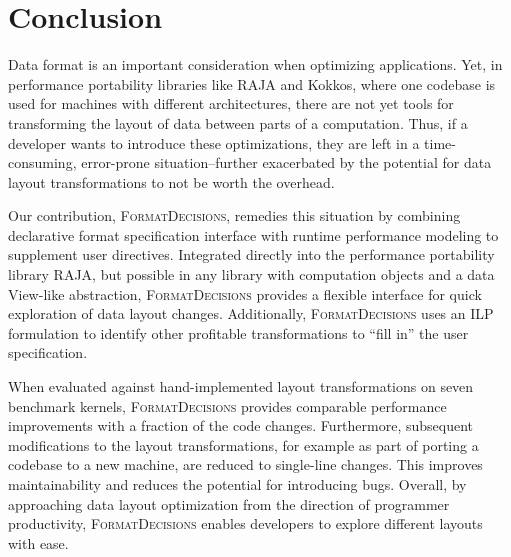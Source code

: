 \documentclass[sigconf,review=true]{acmart}
\newcommand{\FormatDecisions}[0]{{\textsc{FormatDecisions}}}
\begin{document}
\section{Conclusion}

Data format is an important consideration when optimizing applications.
Yet, in performance portability libraries like RAJA and Kokkos, where one codebase is used for machines with different architectures, there are not yet tools for transforming the layout of data between parts of a computation. 
Thus, if a developer wants to introduce these optimizations, they are left in a time-consuming, error-prone situation--further exacerbated by the potential for data layout transformations to not be worth the overhead.

Our contribution, \FormatDecisions, remedies this situation by combining declarative format specification  interface with runtime performance modeling to supplement user directives.
Integrated directly into the performance portability library RAJA, but possible in any library with computation objects and a data View-like abstraction, \FormatDecisions{} provides a flexible interface for quick exploration of data layout changes. 
Additionally, \FormatDecisions{} uses an ILP formulation to identify other profitable transformations to \enquote{fill in} the user specification.

When evaluated against hand-implemented layout transformations on seven benchmark kernels, \FormatDecisions{} provides comparable performance improvements with a fraction of the code changes.
Furthermore, subsequent modifications to the layout transformations, for example as part of porting a codebase to a new machine, are reduced to single-line changes. 
This improves maintainability and reduces the potential for introducing bugs.
Overall, by approaching data layout optimization from the direction of programmer productivity, \FormatDecisions{} enables developers to explore different layouts with ease. 

 \balance



\end{document}
